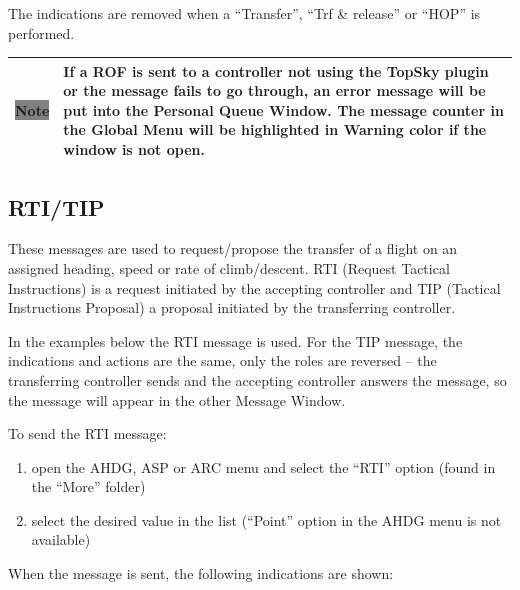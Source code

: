 \documentclass[a4paper,oneside,11pt]{memoir}
\newcommand{\colorref}[1]{\colorbox{Flight Highlight}{\color{#1}#1}}
\newcommand{\note}[1]{
  \begin{center}
    
    \begin{tabular}{| P{1.5cm}|p{10.5cm} |}
      \hline
      \cellcolor{shadecolor}\colorbox{gray}{\color{white}Note} &\cellcolor{shadecolor} #1 \\ \hline
    \end{tabular}
  \end{center}
}
\begin{document}
The indications are removed when a “Transfer”, “Trf \& release” or “HOP” is performed.

\note{If a ROF is sent to a controller not using the TopSky plugin or the message fails to go through, an error message will be put into the Personal Queue Window. The message counter in the Global Menu will be highlighted in \colorref{Warning} color if the window is not open.}

\subsection{RTI/TIP}
\label{coo:rti}\label{coo:tip}
These messages are used to request/propose the transfer of a flight on an assigned heading, speed or rate of climb/descent. RTI (Request Tactical Instructions) is a request initiated by the accepting controller and TIP (Tactical Instructions Proposal) a proposal initiated by the transferring controller.

\bigskip

In the examples below the RTI message is used. For the TIP message, the indications and actions are the same, only the roles are reversed – the transferring controller sends and the accepting controller answers the message, so the message will appear in the other Message Window.

To send the RTI message:

\begin{enumerate}
  \item open the AHDG, ASP or ARC menu and select the “RTI” option (found in the “More” folder) 
  \item select the desired value in the list (“Point” option in the AHDG menu is not available)
\end{enumerate}

When the message is sent, the following indications are shown:
\end{document}
